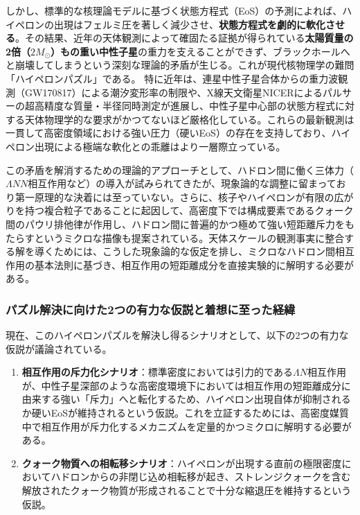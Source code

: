 \documentclass[11pt,a4j,dvipdfmx]{jarticle} 					%
\newcommand{\研究課題名}{加速器実験による短距離バリオン間相互作用の解明と中性子星ハイペロンパズルの解決}
\newcommand{\研究機関名}{東北大学}
\newcommand{\研究代表者氏名}{市川裕大}
\newcommand{\研究期間の最終元号年度}{13}
\begin{document}
しかし、標準的な核理論モデルに基づく状態方程式（EoS）の予測によれば、ハイペロンの出現はフェルミ圧を著しく減少させ、\textbf{状態方程式を劇的に軟化させる}。その結果、近年の天体観測によって確固たる証拠が得られている\textbf{太陽質量の2倍（$2M_\odot$）もの重い中性子星}の重力を支えることができず、ブラックホールへと崩壊してしまうという深刻な理論的矛盾が生じる。これが現代核物理学の難問「ハイペロンパズル」である。
特に近年は、連星中性子星合体からの重力波観測（GW170817）による潮汐変形率の制限や、X線天文衛星NICERによるパルサーの超高精度な質量・半径同時測定が進展し、中性子星中心部の状態方程式に対する天体物理学的な要求がかつてないほど厳格化している。これらの最新観測は一貫して高密度領域における強い圧力（硬いEoS）の存在を支持しており、ハイペロン出現による極端な軟化との乖離はより一層際立っている。

この矛盾を解消するための理論的アプローチとして、ハドロン間に働く三体力（$\Lambda NN$相互作用など）の導入が試みられてきたが、現象論的な調整に留まっており第一原理的な決着には至っていない。さらに、核子やハイペロンが有限の広がりを持つ複合粒子であることに起因して、高密度下では構成要素であるクォーク間のパウリ排他律が作用し、ハドロン間に普遍的かつ極めて強い短距離斥力をもたらすというミクロな描像も提案されている。天体スケールの観測事実に整合する解を導くためには、こうした現象論的な仮定を排し、ミクロなハドロン間相互作用の基本法則に基づき、相互作用の短距離成分を直接実験的に解明する必要がある。

\subsubsection{パズル解決に向けた2つの有力な仮説と着想に至った経緯}
現在、このハイペロンパズルを解決し得るシナリオとして、以下の2つの有力な仮説が議論されている。
\begin{enumerate}
    \item \textbf{相互作用の斥力化シナリオ}：標準密度においては引力的である$\Lambda N$相互作用が、中性子星深部のような高密度環境下においては相互作用の短距離成分に由来する強い「斥力」へと転化するため、ハイペロン出現自体が抑制されるか硬いEoSが維持されるという仮説。これを立証するためには、高密度媒質中で相互作用が斥力化するメカニズムを定量的かつミクロに解明する必要がある。
    \item \textbf{クォーク物質への相転移シナリオ}：ハイペロンが出現する直前の極限密度においてハドロンからの非閉じ込め相転移が起き、ストレンジクォークを含む解放されたクォーク物質が形成されることで十分な縮退圧を維持するという仮説。
\end{enumerate}
\end{document}
